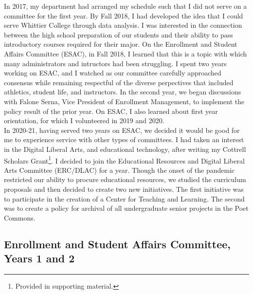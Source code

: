 \documentclass[../../../main.tex]{subfiles}
\begin{document}
\label{sec:committee_service}

In 2017, my department had arranged my schedule such that I did not serve on a committee for the first year.  By Fall 2018, I had developed the idea that I could serve Whittier College through data analysis.  I was interested in the connection between the high school preparation of our students and their ability to pass introductory courses required for their major.  On the Enrollment and Student Affairs Committee (ESAC), in Fall 2018, I learned that this is a topic with which many administrators and intructors had been struggling.  I spent two years working on ESAC, and I watched as our committee carefully approached consensus while remaining respectful of the diverse perpectives that included athletics, student life, and instructors.  In the second year, we began discussions with Falone Serna, Vice President of Enrollment Management, to implement the policy result of the prior year.  On ESAC, I also learned about first year orientation, for which I volunteered in 2019 and 2020.
\\
\vspace{0.15cm}
In 2020-21, having served two years on ESAC, we decided it would be good for me to experience service with other types of committees.  I had taken an interest in the Digital Liberal Arts, and educational technology, after writing my Cottrell Scholars Grant\footnote{Provided in supporting material.}.  I decided to join the Educational Resources and Digital Liberal Arts Committee (ERC/DLAC) for a year.  Though the onset of the pandemic restricted our ability to procure educational resources, we studied the curriculum proposals and then decided to create two new initiatives.  The first initiative was to participate in the creation of a Center for Teaching and Learning.  The second was to create a policy for archival of all undergraduate senior projects in the Poet Commons.

\subsection{Enrollment and Student Affairs Committee, Years 1 and 2}
\end{document}
